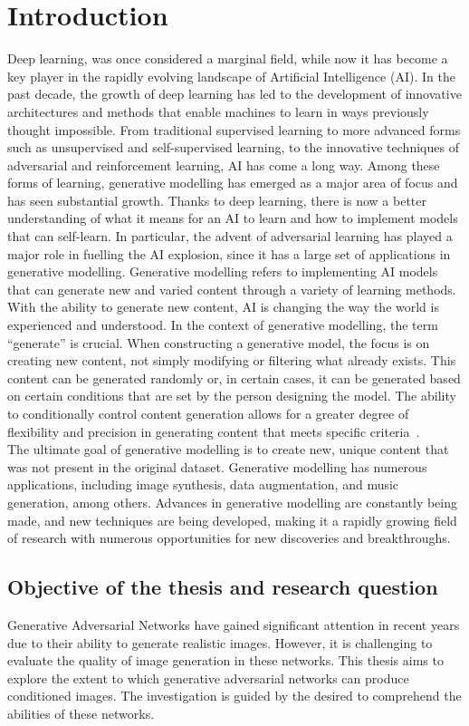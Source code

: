 \section{Introduction}
\label{section:IntroductionChapter}
Deep learning, was once considered a marginal field, while now it has become a key player in the rapidly evolving landscape of Artificial Intelligence (AI). In the past decade, the growth of deep learning has led to the development of innovative architectures and methods that enable machines to learn in ways previously thought impossible. From traditional supervised learning to more advanced forms such as unsupervised and self-supervised learning, to the innovative techniques of adversarial and reinforcement learning, AI has come a long way. Among these forms of learning, generative modelling has emerged as a major area of focus and has seen substantial growth. Thanks to deep learning, there is now a better understanding of what it means for an AI to learn and how to implement models that can self-learn. In particular, the advent of adversarial learning has played a major role in fuelling the AI explosion, since it has a large set of applications in generative modelling. Generative modelling refers to implementing AI models that can generate new and varied content through a variety of learning methods. With the ability to generate new content, AI is changing the way the world is experienced and understood. In the context of generative modelling, the term “generate” is crucial. When constructing a generative model, the focus is on creating new content, not simply modifying or filtering what already exists. This content can be generated randomly or, in certain cases, it can be generated based on certain conditions that are set by the person designing the model. The ability to conditionally control content generation allows for a greater degree of flexibility and precision in generating content that meets specific criteria~\cite{GeneratingNewRealityBook}.\\
The ultimate goal of generative modelling is to create new, unique content that was not present in the original dataset. Generative modelling has numerous applications, including image synthesis, data augmentation, and music generation, among others. Advances in generative modelling are constantly being made, and new techniques are being developed, making it a rapidly growing field of research with numerous opportunities for new discoveries and breakthroughs.

\subsection{Objective of the thesis and research question}
Generative Adversarial Networks have gained significant attention in recent years due to their ability to generate realistic images. However, it is challenging to evaluate the quality of image generation in these networks. This thesis aims to explore the extent to which generative adversarial networks can produce conditioned images. The investigation is guided by the desired to comprehend the abilities of these networks.

